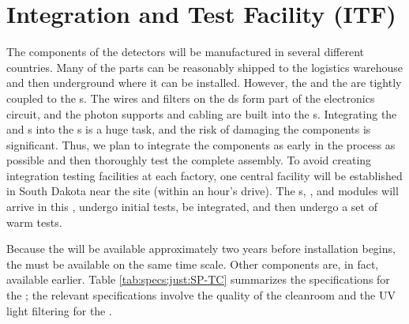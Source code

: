 \section{Integration and Test Facility (ITF)}
\label{sec:fdsp-tc-itf}



The components of the  detectors will be manufactured in several different countries. 
Many of the parts can be reasonably shipped to the logistics warehouse and then underground where it can be installed. 
However, the   and the  are tightly coupled to the s. 
The wires and filters on the ds form part of the electronics circuit, and the photon supports and cabling are built into the s. 
Integrating the  and s into the s is a huge task, and the risk of damaging the components is significant. Thus, we plan to integrate the components as early in the process as possible and then thoroughly test the complete assembly.
To avoid creating integration testing facilities at each factory, one central facility will be established in South Dakota near the  site  (within an hour's drive). 
The s, , and  modules will arrive in this , undergo initial tests, be integrated, and then undergo a set of warm tests. 

Because the  will be available approximately two years before installation begins, the  must be available on the same time scale. Other components are, in fact, available earlier. 
Table \ref{tab:specs:just:SP-TC} summarizes the specifications for the ;  
the relevant specifications involve the quality of the cleanroom and the UV light filtering for the .






